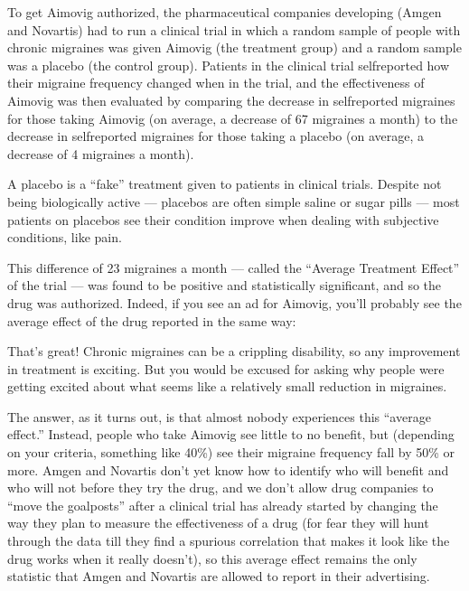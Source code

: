 \documentclass[letterpaper,10pt,english]{jupyterBook}
\begin{document}
\sphinxAtStartPar
To get Aimovig authorized, the pharmaceutical companies developing (Amgen and Novartis) had to run a clinical trial in which a random sample of people with chronic migraines was given Aimovig (the treatment group) and a random sample was a placebo (the control group). Patients in the clinical trial self\sphinxhyphen{}reported how their migraine frequency changed when in the trial, and the effectiveness of Aimovig was then evaluated by comparing the decrease in self\sphinxhyphen{}reported migraines for those taking Aimovig (on average, a decrease of 6\sphinxhyphen{}7 migraines a month) to the decrease in self\sphinxhyphen{}reported migraines for those taking a placebo (on average, a decrease of 4 migraines a month).%
\begin{footnote}[1]\sphinxAtStartFootnote
A placebo is a “fake” treatment given to patients in clinical trials. Despite not being biologically active — placebos are often simple saline or sugar pills — most patients on placebos see their condition improve when dealing with subjective conditions, like pain.
%
\end{footnote} This difference of 2\sphinxhyphen{}3 migraines a month — called the “Average Treatment Effect” of the trial — was found to be positive and statistically significant, and so the drug was authorized. Indeed, if you see an ad for Aimovig, you’ll probably see the average effect of the drug reported in the same way:

\sphinxAtStartPar
{}

\sphinxAtStartPar
That’s great! Chronic migraines can be a crippling disability, so any improvement in treatment is exciting. But you would be excused for asking why people were getting  excited about what seems like a relatively small reduction in migraines.

\sphinxAtStartPar
The answer, as it turns out, is that almost nobody experiences this “average effect.” Instead,  people who take Aimovig see little to no benefit, but  (depending on your criteria, something like 40\%) see their migraine frequency fall by 50\% or more. Amgen and Novartis don’t yet know how to identify who will benefit and who will not before they try the drug, and we don’t allow drug companies to “move the goalposts” after a clinical trial has already started by changing the way they plan to measure the effectiveness of a drug (for fear they will hunt through the data till they find a spurious correlation that makes it look like the drug works when it really doesn’t), so this average effect remains the only statistic that Amgen and Novartis are allowed to report in their advertising.
\end{document}

